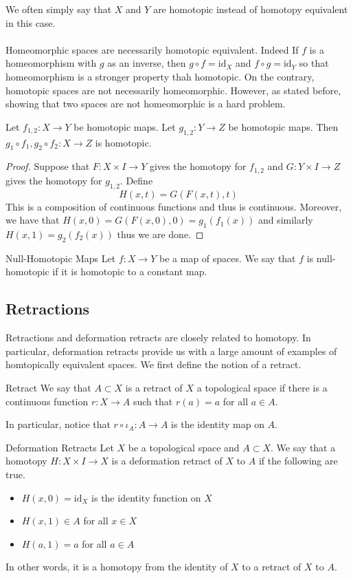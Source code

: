 \documentclass[a4paper]{article}
\begin{document}
We often simply say that $X$ and $Y$ are homotopic instead of homotopy equivalent in this case. \\~\\

Homeomorphic spaces are necessarily homotopic equivalent. Indeed If $f$ is a homeomorphism with $g$ as an inverse, then $g\circ f=\text{id}_X$ and $f\circ g=\text{id}_Y$ so that homeomorphism is a stronger property thah homotopic. On the contrary, homotopic spaces are not necessarily homeomorphic. However, as stated before, showing that two spaces are not homeomorphic is a hard problem. 

\begin{lmm}{}{} Let $f_{1,2}:X\to Y$ be homotopic maps. Let $g_{1,2}:Y\to Z$ be homotopic maps. Then $g_1\circ f_1,g_2\circ f_2:X\to Z$ is homotopic. \tcbline
\begin{proof}
Suppose that $F:X\times I\to Y$ gives the homotopy for $f_{1,2}$ and $G:Y\times I\to Z$ gives the homotopy for $g_{1,2}$. Define $$H(x,t)=G(F(x,t),t)$$ This is a composition of continuous functions and thus is continuous. Moreover, we have that $H(x,0)=G(F(x,0),0)=g_1(f_1(x))$ and similarly $H(x,1)=g_2(f_2(x))$ thus we are done. 
\end{proof}
\end{lmm}

\begin{defn}{Null-Homotopic Maps}{} Let $f:X\to Y$ be a map of spaces. We say that $f$ is null-homotopic if it is homotopic to a constant map. 
\end{defn}

\subsection{Retractions}
Retractions and deformation retracts are closely related to homotopy. In particular, deformation retracts provide us with a large amount of examples of homtopically equivalent spaces. We first define the notion of a retract. 

\begin{defn}{Retract}{} We say that $A\subset X$ is a retract of $X$ a topological space if there is a continuous function $r:X\to A$ such that $r(a)=a$ for all $a\in A$. 
\end{defn}

In particular, notice that $r\circ\iota_A:A\to A$ is the identity map on $A$. 

\begin{defn}{Deformation Retracts}{} Let $X$ be a topological space and $A\subset X$. We say that a homotopy $H:X\times I\to X$ is a deformation retract of $X$ to $A$ if the following are true. 
\begin{itemize}
\item $H(x,0)=\text{id}_X$ is the identity function on $X$
\item $H(x,1)\in A$ for all $x\in X$
\item $H(a,1)=a$ for all $a\in A$
\end{itemize}
In other words, it is a homotopy from the identity of $X$ to a retract of $X$ to $A$. 
\end{defn}
\end{document}
